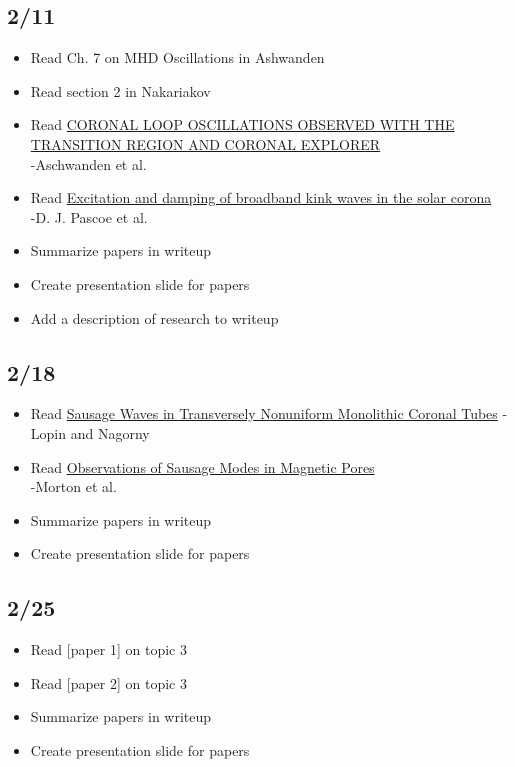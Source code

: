 \documentclass[12pt]{article}
\begin{document}
\subsection*{2/11}
\begin{itemize}
    \item Read Ch. 7 on MHD Oscillations in Ashwanden
    \item Read section 2 in Nakariakov
    \item Read
        \href{http://adsabs.harvard.edu/abs/1999ApJ...520..880A}
        {\textcolor{cobalt}{CORONAL LOOP OSCILLATIONS OBSERVED WITH THE TRANSITION
        REGION AND CORONAL EXPLORER}}\\
        -Aschwanden et al.
    \item Read
        \href{http://cdsads.u-strasbg.fr/abs/2015A\%26A...578A..99P}
        {\textcolor{cobalt}{Excitation and damping of broadband
        kink waves in the solar corona}}\\
        -D. J. Pascoe et al.
    \item Summarize papers in writeup
    \item Create presentation slide for papers
    \item Add a description of research to writeup
\end{itemize}

\subsection*{2/18}
\begin{itemize}
    \item Read
        \href{http://adsabs.harvard.edu/abs/2015ApJ...810...87L}
        {\textcolor{cobalt}{Sausage Waves in Transversely Nonuniform Monolithic Coronal
        Tubes}} -Lopin and Nagorny
    \item Read
        \href{http://cdsads.u-strasbg.fr/abs/2011ApJ...729L..18M}
        {\textcolor{cobalt}{Observations of Sausage Modes in Magnetic Pores}}\\
        -Morton et al.
    \item Summarize papers in writeup
    \item Create presentation slide for papers
\end{itemize}

\subsection*{2/25}
\begin{itemize}
    \item Read [paper 1] on topic 3
    \item Read [paper 2] on topic 3
    \item Summarize papers in writeup
    \item Create presentation slide for papers
\end{itemize}
\end{document}
